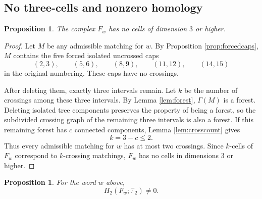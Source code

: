 \documentclass[12pt]{article}
\newcommand{\Ftwo}{\mathbb{F}_2}
\newtheorem{proposition}[theorem]{Proposition}
\theoremstyle{definition}
\begin{document}
\subsection{No three-cells and nonzero homology}

\begin{proposition}\label{prop:nohigh}
The complex \(F_w\) has no cells of dimension \(3\) or higher.
\end{proposition}

\begin{proof}
Let \(M\) be any admissible matching for \(w\).  By Proposition \ref{prop:forcedcaps}, \(M\) contains the five forced isolated uncrossed caps
\[
(2,3),\qquad (5,6),\qquad (8,9),\qquad (11,12),\qquad (14,15)
\]
in the original numbering.  These caps have no crossings.

After deleting them, exactly three intervals remain.  Let \(k\) be the number of crossings among these three intervals.  By Lemma \ref{lem:forest}, \(\Gamma(M)\) is a forest.  Deleting isolated tree components preserves the property of being a forest, so the subdivided crossing graph of the remaining three intervals is also a forest.  If this remaining forest has \(c\) connected components, Lemma \ref{lem:crosscount} gives
\[
k=3-c\le 2.
\]
Thus every admissible matching for \(w\) has at most two crossings.  Since \(k\)-cells of \(F_w\) correspond to \(k\)-crossing matchings, \(F_w\) has no cells in dimensions \(3\) or higher.
\end{proof}

\begin{proposition}\label{prop:homology}
For the word \(w\) above,
\[
H_2(F_w;\Ftwo)\neq 0.
\]
\end{proposition}
\end{document}
